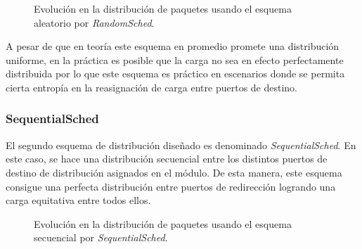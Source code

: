\begin{figure}[th!]
\centering
{}
\caption{Evolución en la distribución de paquetes usando el esquema aleatorio por \emph{RandomSched}.}
\label{fig:RandomSched}
\end{figure}

A pesar de que en teoría este esquema en promedio promete una distribución uniforme, en la práctica es posible que la carga no sea en efecto perfectamente distribuida por lo que este esquema es práctico en escenarios donde se permita cierta entropía en la reasignación de carga entre puertos de destino.

\subsubsection{SequentialSched}
El segundo esquema de distribución diseñado es denominado \emph{SequentialSched}. En este caso, se hace una distribución secuencial entre los distintos puertos de destino de distribución asignados en el módulo. De esta manera, este esquema consigue una perfecta distribución entre puertos de redirección logrando una carga equitativa entre todos ellos.

\begin{figure}[th!]
\centering
{}
\caption{Evolución en la distribución de paquetes usando el esquema secuencial por \emph{SequentialSched}.}
\label{fig:SequentialSched}
\end{figure}

